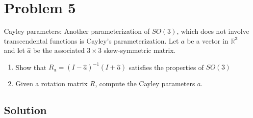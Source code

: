 \section*{Problem 5}

Cayley parameters: Another parameterization of \(S O(3)\), which does not involve transcendental functions is Cayley's parameterization.
Let \(a\) be a vector in \(\mathbb{R}^{3}\) and let \(\hat{a}\) be the associated \(3 \times 3\) skew-symmetric matrix.
\begin{enumerate}[label= (\alph*)]
    \item Show that \(R_{a}=(I-\hat{a})^{-1}(I+\hat{a})\) satisfies the properties of \(S O(3)\)
    \item Given a rotation matrix \(R\), compute the Cayley parameters \(a\).
\end{enumerate}

\subsection*{Solution}

